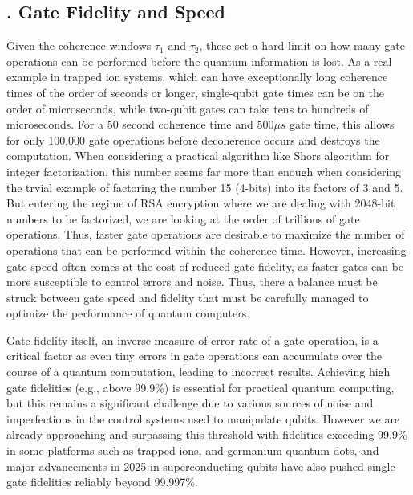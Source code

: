 \documentclass{elbioimp2}
\begin{document}
\subsection{. Gate Fidelity and Speed}
Given the coherence windows $\tau_1$ and $\tau_2$, these set a hard limit on how many gate operations can be performed before the quantum information is lost. As a real example in trapped ion systems, which can have exceptionally long coherence times of the order of seconds or longer, single-qubit gate times can be on the order of microseconds, while two-qubit gates can take tens to hundreds of microseconds. For a 50 second coherence time and 500$\mu s$ gate time, this allows for only 100,000 gate operations before decoherence occurs and destroys the computation. When considering a practical algorithm like Shors algorithm for integer factorization, this number seems far more than enough when considering the trvial example of factoring the number 15 (4-bits) into its factors of 3 and 5. But entering the regime of RSA encryption where we are dealing with 2048-bit numbers to be factorized, we are looking at the order of trillions of gate operations. Thus, faster gate operations are desirable to maximize the number of operations that can be performed within the coherence time. However, increasing gate speed often comes at the cost of reduced gate fidelity, as faster gates can be more susceptible to control errors and noise. Thus, there a balance must be struck between gate speed and fidelity that must be carefully managed to optimize the performance of quantum computers.

Gate fidelity itself, an inverse measure of error rate of a gate operation, is a critical factor as even tiny errors in gate operations can accumulate over the course of a quantum computation, leading to incorrect results. Achieving high gate fidelities (e.g., above 99.9\%)\cite{99.9percent-required-fidelity} is essential for practical quantum computing, but this remains a significant challenge due to various sources of noise and imperfections in the control systems used to manipulate qubits. However we are already approaching and surpassing this threshold with fidelities exceeding 99.9\% in some platforms such as trapped ions, and germanium quantum dots\cite{IonQ2022,https://www.nature.com/articles/s41467-025-63241-4}, and major advancements in 2025 in superconducting qubits have also pushed single gate fidelities reliably beyond 99.997\%\cite{https://journals.aps.org/prxquantum/abstract/10.1103/PRXQuantum.5.040342}.
\end{document}

